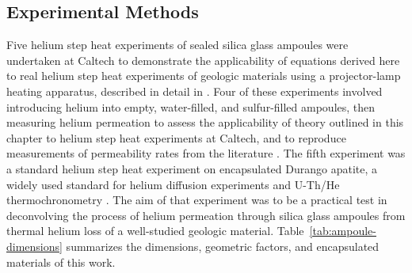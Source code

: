 \subsection{Experimental Methods}\label{experimental-methods}

Five helium step heat experiments of sealed silica glass ampoules were undertaken at Caltech to demonstrate the applicability of equations derived here to real helium step heat experiments of geologic materials using a projector-lamp heating apparatus, described in detail in \citet{farley1999}. Four of these experiments involved introducing helium into empty, water-filled, and sulfur-filled ampoules, then measuring helium permeation to assess the applicability of theory outlined in this chapter to helium step heat experiments at Caltech, and to reproduce measurements of permeability rates from the literature \citep{norton1953,jones1953,swets1961,altemose1961}. The fifth experiment was a standard helium step heat experiment on encapsulated Durango apatite, a widely used standard for helium diffusion experiments and U-Th/He thermochronometry \citep{zeitler1987,wolf1996,farley2000,shusterfarley2004,shuster2006,flowers2007}. The aim of that experiment was to be a practical test in deconvolving the process of helium permeation through silica glass ampoules from thermal helium loss of a well-studied geologic material. Table~\ref{tab:ampoule-dimensions} summarizes the dimensions, geometric factors, and encapsulated materials of this work.

